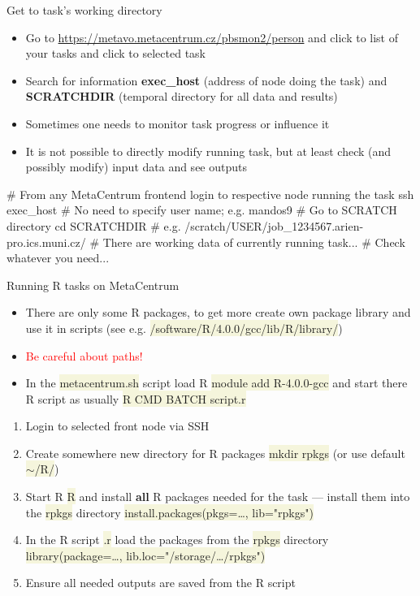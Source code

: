 \documentclass[compress, ucs, xelatex, 11pt, xcolor=svgnames, aspectratio=169,
	hyperref={
		bookmarks=true,
		unicode=true,
		colorlinks=true,
		pdftitle={Linux, command line and MetaCentrum},
		plainpages=false,
		pdfauthor={Vojtech Zeisek},
		pdfsubject={Course about use of Linux command line, writing shell scripts and using MetaCentrum of CESNET},
		pdfcreator={XeLaTeX},
		pdfkeywords={Linux, GNU, BASH, shell, command line, MetaCentrum},
		linkcolor=DarkRed, %
		anchorcolor=DarkBlue, %
		citecolor=Indigo, %
		filecolor=NavyBlue, %
		menucolor=DarkMagenta, %
		urlcolor=DarkBlue, %
		pdftex},
	url={hyphens, lowtilde} %
	]{beamer}
\renewcommand{\texttt}[1]{\colorbox{Beige}{{\ttfamily #1}}}
\renewcommand{\alert}[1]{\textcolor{red}{#1}}
\begin{document}
\begin{frame}[fragile]{Get to task's working directory}
	\begin{itemize}
		\item Go to \url{https://metavo.metacentrum.cz/pbsmon2/person} and click to list of your tasks and click to selected task
		\item Search for information \textbf{exec\_host} (address of node doing the task) and \textbf{SCRATCHDIR} (temporal directory for all data and results)
		\item Sometimes one needs to monitor task progress or influence it
		\item It is not possible to directly modify running task, but at least check (and possibly modify) input data and see outputs
	\end{itemize}
	\begin{bashcode}
    # From any MetaCentrum frontend login to respective node running the task
    ssh exec_host # No need to specify user name; e.g. mandos9
    # Go to SCRATCH directory
    cd SCRATCHDIR # e.g. /scratch/USER/job_1234567.arien-pro.ics.muni.cz/
    # There are working data of currently running task...
    # Check whatever you need...
	\end{bashcode}
\end{frame}

\begin{frame}{Running R tasks on MetaCentrum}
	\begin{itemize}
		\item There are only some R packages, to get more create own package library and use it in scripts (see e.g. \texttt{/software/R/4.0.0/gcc/lib/R/library/})
		\item \alert{Be careful about paths!}
		\item In the \texttt{metacentrum.sh} script load R \texttt{module add R-4.0.0-gcc} and start there R script as usually \texttt{R CMD BATCH script.r}
	\end{itemize}
	\begin{enumerate}
		\item Login to selected front node via SSH
		\item Create somewhere new directory for R packages \texttt{mkdir rpkgs} (or use default \texttt{$\sim$/R/})
		\item Start R \texttt{R} and install \textbf{all} R packages needed for the task --- install them into the \texttt{rpkgs} directory \texttt{install.packages(pkgs=\ldots, lib="rpkgs")}
		\item In the R script \texttt{*.r} load the packages from the \texttt{rpkgs} directory \texttt{library(package=\ldots, lib.loc="/storage/\ldots/rpkgs")}
		\item Ensure all needed outputs are saved from the R script
	\end{enumerate}
\end{frame}
\end{document}
